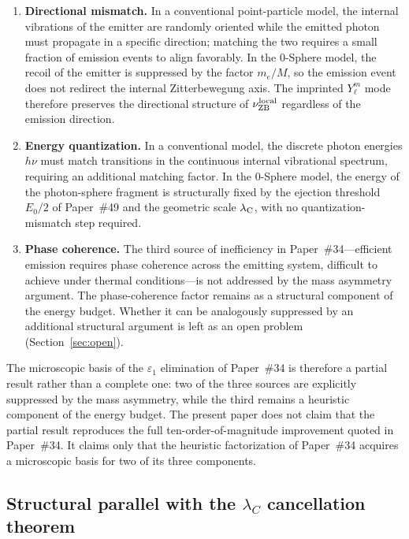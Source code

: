 \documentclass[%
 reprint, amsmath,amssymb, aps, prb, ]{revtex4-2}
\numberwithin{equation}{section}
\newcommand{\nuZBl}{\nu_{\text{ZB}}^{\rm local}}
\newcommand{\lambdaC}{\lambda_{\rm C}}
\begin{document}
\begin{enumerate}[label=(\roman*), leftmargin=2em, itemsep=4pt]
\item \textbf{Directional mismatch.} In a conventional point-particle model, the internal vibrations of the emitter are randomly oriented while the emitted photon must propagate in a specific direction; matching the two requires a small fraction of emission events to align favorably. In the 0-Sphere model, the recoil of the emitter is suppressed by the factor $m_e/M$, so the emission event does not redirect the internal Zitterbewegung axis. The imprinted $Y_\ell^m$ mode therefore preserves the directional structure of $\nuZBl$ regardless of the emission direction.

\item \textbf{Energy quantization.} In a conventional model, the discrete photon energies $h\nu$ must match transitions in the continuous internal vibrational spectrum, requiring an additional matching factor. In the 0-Sphere model, the energy of the photon-sphere fragment is structurally fixed by the ejection threshold $E_0/2$ of Paper~\#49 and the geometric scale $\lambdaC$, with no quantization-mismatch step required.

\item \textbf{Phase coherence.} The third source of inefficiency in Paper~\#34---efficient emission requires phase coherence across the emitting system, difficult to achieve under thermal conditions---is not addressed by the mass asymmetry argument. The phase-coherence factor remains as a structural component of the energy budget. Whether it can be analogously suppressed by an additional structural argument is left as an open problem (Section~\ref{sec:open}).
\end{enumerate}

The microscopic basis of the $\varepsilon_1$ elimination of Paper~\#34 is therefore a partial result rather than a complete one: two of the three sources are explicitly suppressed by the mass asymmetry, while the third remains a heuristic component of the energy budget. The present paper does not claim that the partial result reproduces the full ten-order-of-magnitude improvement quoted in Paper~\#34. It claims only that the heuristic factorization of Paper~\#34 acquires a microscopic basis for two of its three components.

\subsection{Structural parallel with the $\lambda_C$ cancellation theorem}
\end{document}
